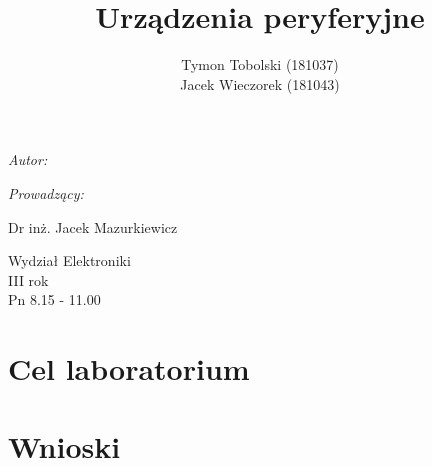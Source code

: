 \documentclass[wide,a4paper,titlepage,12pt] {article}
\title{Urządzenia peryferyjne}
\author{Tymon Tobolski (181037)\\ Jacek Wieczorek (181043)}
\makeatletter
\renewcommand{\maketitle}{
\begin{titlepage}
  \begin{center}
    \vspace*{3cm}
    \LARGE \@title \par
    \vspace{2cm}
    \textit{\small Autor:}\par
    \normalsize \@author\par \normalsize
    \vspace{3cm}
    \textit{\small Prowadzący:}\par
    Dr inż. Jacek Mazurkiewicz \par
    \vspace{2cm}
    Wydział Elektroniki\\ III rok\\ Pn 8.15 - 11.00\par
    \vspace{4cm}
    \small \@date
  \end{center}
\end{titlepage}
}
\makeatother
\begin{document}
\maketitle

\section{Cel laboratorium}
\paragraph{}

\section{Wnioski}
\paragraph{}
\end{document}
